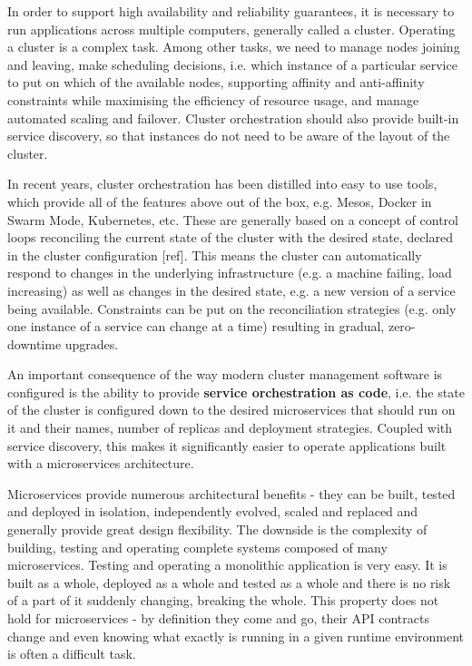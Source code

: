 \documentclass[reprint,amsmath,amssymb,aps]{revtex4-1}
\begin{document}
In order to support high availability and reliability guarantees, it is necessary to run applications across multiple computers, generally called a cluster. Operating a cluster is a complex task. Among other tasks, we need to manage nodes joining and leaving, make scheduling decisions, i.e. which instance of a particular service to put on which of the available nodes, supporting affinity and anti-affinity constraints while maximising the efficiency of resource usage, and manage automated scaling and failover. Cluster orchestration should also provide built-in service discovery, so that instances do not need to be aware of the layout of the cluster.

In recent years, cluster orchestration has been distilled into easy to use tools, which provide all of the features above out of the box, e.g. Mesos, Docker in Swarm Mode, Kubernetes, etc. These are generally based on a concept of control loops reconciling the current state of the cluster with the desired state, declared in the cluster configuration [ref]. This means the cluster can automatically respond to changes in the underlying infrastructure (e.g. a machine failing, load increasing) as well as changes in the desired state, e.g. a new version of a service being available. Constraints can be put on the reconciliation strategies (e.g. only one instance of a service can change at a time) resulting in gradual, zero-downtime upgrades.

An important consequence of the way modern cluster management software is configured is the ability to provide \textbf{service orchestration as code}, i.e. the state of the cluster is configured down to the desired microservices that should run on it and their names, number of replicas and deployment strategies. Coupled with service discovery, this makes it significantly easier to operate applications built with a microservices architecture. 

Microservices provide numerous architectural benefits - they can be built, tested and deployed in isolation, independently evolved, scaled and replaced and generally provide great design flexibility. The downside is the complexity of building, testing and operating complete systems composed of many microservices. Testing and operating a monolithic application is very easy. It is built as a whole, deployed as a whole and tested as a whole and there is no risk of a part of it suddenly changing, breaking the whole. This property does not hold for microservices - by definition they come and go, their API contracts change and even knowing what exactly is running in a given runtime environment is often a difficult task.
\end{document}
